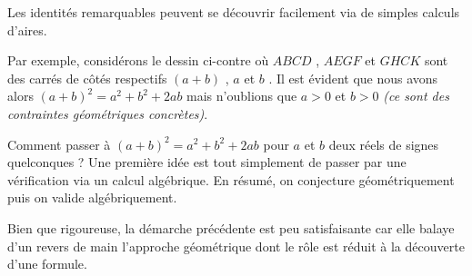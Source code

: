 \documentclass[12pt]{amsart}
\begin{document}
Les identités remarquables peuvent se découvrir facilement via de simples calculs d'aires.


\medskip

Par exemple, considérons le dessin ci-contre où $ABCD$ , $AEGF$ et $GHCK$ sont des carrés de côtés respectifs $(a + b)$ , $a$ et $b$ .
Il est évident que nous avons alors $(a + b)^2 = a^2 + b^2 + 2 ab$ mais n'oublions que $a > 0$ et $b > 0$ \emph{(ce sont des contraintes géométriques concrètes)}.


\medskip

Comment passer à $(a + b)^2 = a^2 + b^2 + 2 ab$ pour $a$ et $b$ deux réels de signes quelconques ?
Une première idée est tout simplement de passer par une vérification via un calcul algébrique. En résumé, on conjecture géométriquement puis on valide algébriquement.


\medskip

\begin{figure} 
	\vspace{-.5em}
	\begin{center}
	\end{center}
	\vspace{-1.25em}
\end{figure} 

Bien que rigoureuse, la démarche précédente est peu satisfaisante car elle balaye d'un revers de main l'approche géométrique dont le rôle est réduit à la découverte d'une formule.
\end{document}
